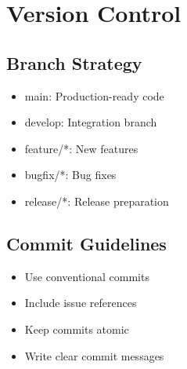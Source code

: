 \section{Version Control}
\subsection{Branch Strategy}
\begin{itemize}
    \item main: Production-ready code
    \item develop: Integration branch
    \item feature/*: New features
    \item bugfix/*: Bug fixes
    \item release/*: Release preparation
\end{itemize}

\subsection{Commit Guidelines}
\begin{itemize}
    \item Use conventional commits
    \item Include issue references
    \item Keep commits atomic
    \item Write clear commit messages
\end{itemize}
